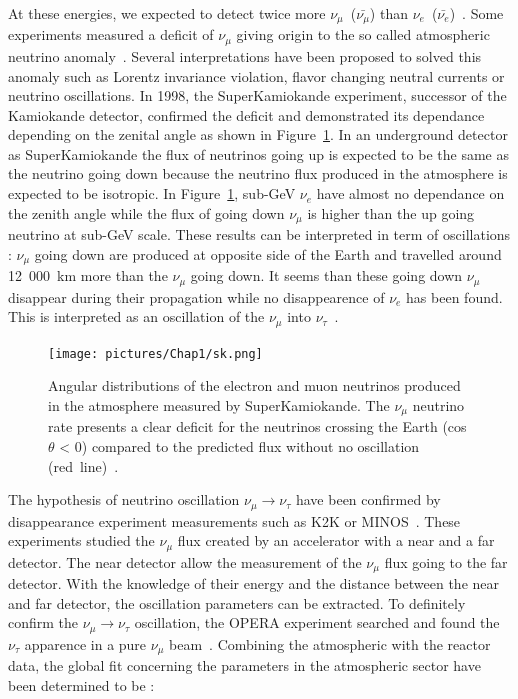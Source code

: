 \documentclass[main.tex]{subfiles}
\begin{document}
\NI At these energies, we expected to detect twice more $\nu_\mu$~($\bar{\nu_\mu}$) than $\nu_e$~($\bar{\nu_e}$)~\cite{AtmosNeutrinoFlux}. Some experiments measured a deficit of $\nu_\mu$ giving origin to the so called atmospheric neutrino anomaly~\cite{AtmosNeutrinoAnomaly}. Several interpretations have been proposed to solved this anomaly such as Lorentz invariance violation, flavor changing neutral currents or neutrino oscillations. In 1998, the SuperKamiokande experiment, successor of the Kamiokande detector, confirmed the deficit and demonstrated its dependance depending on the zenital angle as shown in Figure~\ref{SKzenitalDependance}. In an underground detector as SuperKamiokande the flux of neutrinos going up is expected to be the same as the neutrino going down because the neutrino flux produced in the atmosphere is expected to be isotropic. In Figure~\ref{SKzenitalDependance}, sub-GeV $\nu_e$ have almost no dependance on the zenith angle while the flux of going down $\nu_\mu$ is higher than the up going neutrino at sub-GeV scale. These results can be interpreted in term of oscillations : $\nu_\mu$ going down are produced at opposite side of the Earth and travelled around 12~000~km more than the $\nu_\mu$ going down. It seems than these going down $\nu_\mu$ disappear during their propagation while no disappearence of $\nu_e$ has been found. This is interpreted as an oscillation of the $\nu_\mu$ into $\nu_\tau$~\cite{EvidenceAtmosNeutrinoOsc}.   




\begin{figure}
\begin{center}
\texttt{[image: pictures/Chap1/sk.png]}
\caption{Angular distributions of the electron and muon neutrinos produced in the atmosphere measured by SuperKamiokande. The $\nu_\mu$ neutrino rate presents a clear deficit for the neutrinos crossing the Earth (cos $\theta$ < 0) compared to the predicted flux without no oscillation (red~line)~\cite{SK}.}
\label{SKzenitalDependance}
\end{center}
\end{figure}


\bigskip


\NI The hypothesis of neutrino oscillation $\nu_\mu \rightarrow \nu_\tau$ have been confirmed by disappearance experiment measurements such as K2K or MINOS~\cite{K2K,MINOS}. These experiments studied the $\nu_\mu$ flux created by an accelerator with a near and a far detector. The near detector allow the measurement of the $\nu_\mu$ flux going to the far detector. With the knowledge of their energy and the distance between the near and far detector, the oscillation parameters can be extracted. To definitely confirm the $\nu_\mu \rightarrow \nu_\tau$ oscillation, the OPERA experiment searched and found the $\nu_\tau$ apparence in a pure $\nu_\mu$ beam~\cite{Opera}. Combining the atmospheric with the reactor data, the global fit concerning the parameters in the atmospheric sector have been determined to be : 
\end{document}
